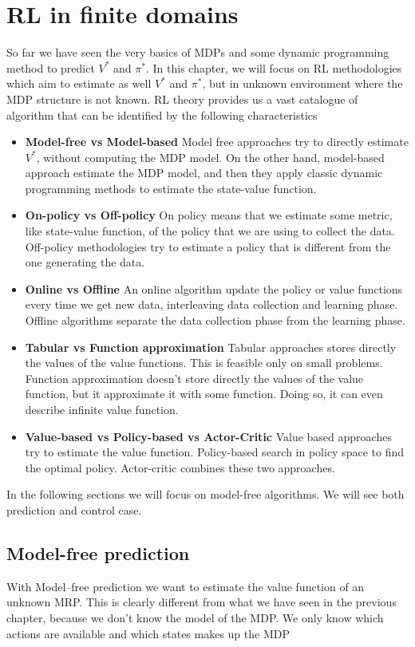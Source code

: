 \documentclass[../main.tex]{subfiles}
\begin{document}
\section{RL in finite domains}
So far we have seen the very basics of MDPs and some dynamic programming method to predict $V^*$ and $\pi^*$. In this chapter, we will focus on RL methodologies which aim to estimate as well $V^*$ and $\pi^*$, but in unknown environment where the MDP structure is not known.
RL theory provides us a vast catalogue of algorithm that can be identified by the following characteristics
\begin{itemize}
    \item \textbf{Model-free vs Model-based} Model free approaches try to directly estimate $V^*$, without computing the MDP model. On the other hand, model-based approach estimate the MDP model, and then they apply classic dynamic programming methods to estimate the state-value function.
    \item \textbf{On-policy vs Off-policy} On policy means that we estimate some metric, like state-value function, of the policy that we are using to collect the data. Off-policy methodologies try to estimate a policy that is different from the one generating the data.
    \item \textbf{Online vs Offline} An online algorithm update the policy or value functions every time we get new data, interleaving data collection and learning phase. Offline algorithms separate the data collection phase from the learning phase.
    \item \textbf{Tabular vs Function approximation} Tabular approaches stores directly the values of the value functions. This is feasible only on small problems. Function approximation doesn't store directly the values of the value function, but it approximate it with some function. Doing so, it can even describe infinite value function.
    \item \textbf{Value-based vs Policy-based vs Actor-Critic} Value based approaches try to estimate the value function. Policy-based search in policy space to find the optimal policy. Actor-critic combines these two approaches.
\end{itemize}
In the following sections we will focus on model-free algorithms. We will see both prediction and control case.
\subsection{Model-free prediction}
With Model–free prediction we want to estimate the value function of an unknown MRP\footnotemark. This is clearly different from what we have seen in the previous chapter, because we don't know the model of the MDP. We only know which actions are available and which states makes up the MDP
\end{document}
